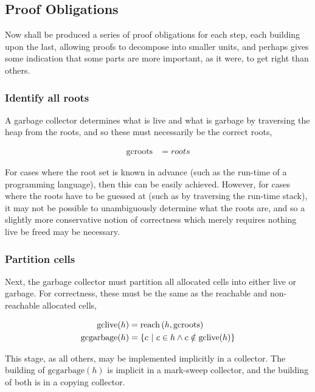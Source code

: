 \subsection{Proof Obligations}
\label{sec:gc-framework-obligations}

Now shall be produced a series of proof obligations for each step,
each building upon the last, allowing proofs to decompose into smaller
units, and perhaps gives some indication that some parts are more
important, as it were, to get right than others.

\subsubsection{Identify all roots}
\label{sec:gc-framework-obligations-roots}

A garbage collector determines what is live and what is garbage by
traversing the heap from the roots, and so these must necessarily be
the correct roots,

\begin{align*}
  \mathrm{gcroots} &= roots
\end{align*}

For cases where the root set is known in advance (such as the run-time
of a programming language), then this can be easily achieved. However,
for cases where the roots have to be guessed at (such as by traversing
the run-time stack), it may not be possible to unambiguously determine
what the roots are, and so a slightly more conservative notion of
correctness which merely requires nothing live be freed may be
necessary.

\subsubsection{Partition cells}
\label{sec:gc-framework-obligations-partition}

Next, the garbage collector must partition all allocated cells into
either live or garbage. For correctness, these must be the same as the
reachable and non-reachable allocated cells,

\begin{align*}
  \mathrm{gclive}(h) &= \mathrm{reach}\left(h, \mathrm{gcroots}\right)\\
  \mathrm{gcgarbage}(h) &= \left\{c~|~c \in h \land c \notin
    \mathrm{gclive}(h)\right\}
\end{align*}

This stage, as all others, may be implemented implicitly in a
collector. The building of $\mathrm{gcgarbage}(h)$ is implicit in a
mark-sweep collector, and the building of both is in a copying
collector.

